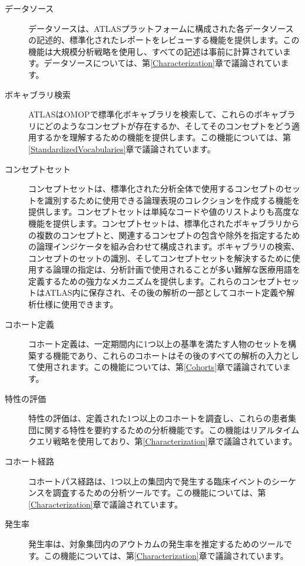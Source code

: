 \documentclass[
  11pt]{book}
\theoremstyle{definition}
\theoremstyle{definition}
\theoremstyle{definition}
\theoremstyle{definition}
\theoremstyle{remark}
\begin{document}
\begin{description}
\item[データソース  ]
データソースは、ATLASプラットフォームに構成された各データソースの記述的、標準化されたレポートをレビューする機能を提供します。この機能は大規模分析戦略を使用し、すべての記述は事前に計算されています。データソースについては、第\ref{Characterization}章で議論されています。
\item[ボキャブラリ検索 ]
ATLASはOMOPで標準化ボキャブラリを検索して、これらのボキャブラリにどのようなコンセプトが存在するか、そしてそのコンセプトをどう適用するかを理解するための機能を提供します。この機能については、第\ref{StandardizedVocabularies}章で議論されています。
\item[コンセプトセット ]
コンセプトセットは、標準化された分析全体で使用するコンセプトのセットを識別するために使用できる論理表現のコレクションを作成する機能を提供します。コンセプトセットは単純なコードや値のリストよりも高度な機能を提供します。コンセプトセットは、標準化されたボキャブラリからの複数のコンセプトと、関連するコンセプトの包含や除外を指定するための論理インジケータを組み合わせて構成されます。ボキャブラリの検索、コンセプトのセットの識別、そしてコンセプトセットを解決するために使用する論理の指定は、分析計画で使用されることが多い難解な医療用語を定義するための強力なメカニズムを提供します。これらのコンセプトセットはATLAS内に保存され、その後の解析の一部としてコホート定義や解析仕様に使用できます。
\item[コホート定義 ]
コホート定義は、一定期間内に1つ以上の基準を満たす人物のセットを構築する機能であり、これらのコホートはその後のすべての解析の入力として使用されます。この機能については、第\ref{Cohorts}章で議論されています。
\item[特性の評価]
特性の評価は、定義された1つ以上のコホートを調査し、これらの患者集団に関する特性を要約するための分析機能です。この機能はリアルタイムクエリ戦略を使用しており、第\ref{Characterization}章で議論されています。
\item[コホート経路 ]
コホートパス経路は、1つ以上の集団内で発生する臨床イベントのシーケンスを調査するための分析ツールです。この機能については、第\ref{Characterization}章で議論されています。
\item[発生率 ]
発生率は、対象集団内のアウトカムの発生率を推定するためのツールです。この機能については、第\ref{Characterization}章で議論されています。

\end{description}
\end{document}

